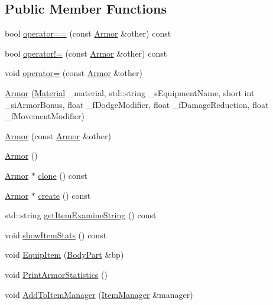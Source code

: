 \subsection*{Public Member Functions}
\begin{DoxyCompactItemize}
\item 
bool \mbox{\hyperlink{class_armor_a400f558650400d25fc5fc3031a455c46}{operator==}} (const \mbox{\hyperlink{class_armor}{Armor}} \&other) const
\item 
bool \mbox{\hyperlink{class_armor_a912e1ad6bfe7509c66c2c4966cf5188c}{operator!=}} (const \mbox{\hyperlink{class_armor}{Armor}} \&other) const
\item 
void \mbox{\hyperlink{class_armor_ad706d994c7d3a3ea4d7c1728faccc0aa}{operator=}} (const \mbox{\hyperlink{class_armor}{Armor}} \&other)
\item 
\mbox{\hyperlink{class_armor_a4a33d37eb11165792cce7035dfb2ff93}{Armor}} (\mbox{\hyperlink{class_material}{Material}} \+\_\+material, std\+::string \+\_\+s\+Equipment\+Name, short int \+\_\+si\+Armor\+Bonus, float \+\_\+f\+Dodge\+Modifier, float \+\_\+f\+Damage\+Reduction, float \+\_\+f\+Movement\+Modifier)
\item 
\mbox{\hyperlink{class_armor_a40d54a621183a93edaecb2cd4e83c800}{Armor}} (const \mbox{\hyperlink{class_armor}{Armor}} \&other)
\item 
\mbox{\hyperlink{class_armor_a23323e95bbeb488eb6fe54cbd83d49a2}{Armor}} ()
\item 
\mbox{\hyperlink{class_armor}{Armor}} $\ast$ \mbox{\hyperlink{class_armor_aac8aec108de9a8a45bada1534c0f23b7}{clone}} () const
\item 
\mbox{\hyperlink{class_armor}{Armor}} $\ast$ \mbox{\hyperlink{class_armor_a21de0acaa6ecdb6f5937166b83da9b01}{create}} () const
\item 
std\+::string \mbox{\hyperlink{class_armor_a731bb4d1fe53070f30a336db82fada2c}{get\+Item\+Examine\+String}} () const
\item 
void \mbox{\hyperlink{class_armor_a4fe1507d7aaf280a18e19f51a6f8c42d}{show\+Item\+Stats}} () const
\item 
void \mbox{\hyperlink{class_armor_a697e23862a5a6bb32fc5b1b143d61f58}{Equip\+Item}} (\mbox{\hyperlink{class_body_part}{Body\+Part}} \&bp)
\item 
void \mbox{\hyperlink{class_armor_a248a63d0d2801a10d6a4039f60b6a0c7}{Print\+Armor\+Statistics}} ()
\item 
void \mbox{\hyperlink{class_armor_a008a9def7f07c141c87771937d856616}{Add\+To\+Item\+Manager}} (\mbox{\hyperlink{class_item_manager}{Item\+Manager}} \&manager)

\end{DoxyCompactItemize}
